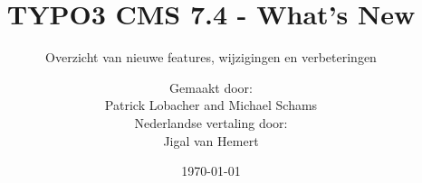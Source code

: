 %

%
%

\documentclass[t]{beamer}

\beamertemplatenavigationsymbolsempty

{
	\usetheme{typo3slides}
}

\title{TYPO3 CMS 7.4 - What's New}
\subtitle{Overzicht van nieuwe features, wijzigingen en verbeteringen}
\author{
	\centerline{Gemaakt door:}
	\centerline{Patrick Lobacher and Michael Schams}
	\vspace{0.4cm}
	\centerline{Nederlandse vertaling door:}
	\centerline{Jigal van Hemert}
}

\date{\today}



\sharefont


\begingroup
	[default]
	\begin{frame}
		\titlepage
	\end{frame}
\endgroup


\section*{TYPO3 CMS 7.4 - What's New}
\begin{frame}[fragile]
	\frametitle{Overzicht hoofdstukken}
	\framesubtitle{Overzicht hoofdstukken}

	\tableofcontents

\end{frame}

